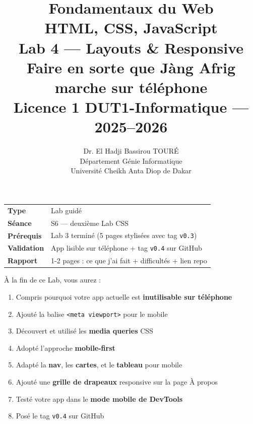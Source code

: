 \documentclass[11pt,a4paper]{article}
\title{%
\vspace{-1cm}
\textbf{\LARGE Fondamentaux du Web}\\
\textbf{\LARGE HTML, CSS, JavaScript}\\[0.8cm]
\textbf{\huge Lab 4 --- Layouts \& Responsive}\\[0.3cm]
\textbf{\Large Faire en sorte que Jàng Afrig marche sur téléphone}\\[0.5cm]
\large Licence 1 DUT1-Informatique --- 2025--2026}
\author{Dr. El Hadji Bassirou TOURÉ\\
Département Génie Informatique\\
Université Cheikh Anta Diop de Dakar}
\date{}
\begin{document}
\maketitle
\thispagestyle{empty}

\vspace{0.5cm}

\begin{prereqbox}
\begin{center}
\begin{tabular}{ll}
\toprule
\textbf{Type} & Lab guidé \\
\textbf{Séance} & S6 --- deuxième Lab CSS \\
\textbf{Prérequis} & Lab 3 terminé (5 pages stylisées avec tag \texttt{v0.3}) \\
\textbf{Validation} & App lisible sur téléphone + tag \texttt{v0.4} sur GitHub \\
\textbf{Rapport} & 1-2 pages : ce que j'ai fait + difficultés + lien repo \\
\bottomrule
\end{tabular}
\end{center}
\end{prereqbox}

\begin{objectifbox}
À la fin de ce Lab, vous aurez :
\begin{enumerate}[nosep]
    \item Compris pourquoi votre app actuelle est \textbf{inutilisable sur téléphone}
    \item Ajouté la balise \texttt{<meta viewport>} pour le mobile
    \item Découvert et utilisé les \textbf{media queries} CSS
    \item Adopté l'approche \textbf{mobile-first}
    \item Adapté la \textbf{nav}, les \textbf{cartes}, et le \textbf{tableau} pour mobile
    \item Ajouté une \textbf{grille de drapeaux} responsive sur la page À propos
    \item Testé votre app dans le \textbf{mode mobile de DevTools}
    \item Posé le tag \texttt{v0.4} sur GitHub
\end{enumerate}
\end{objectifbox}
\end{document}
